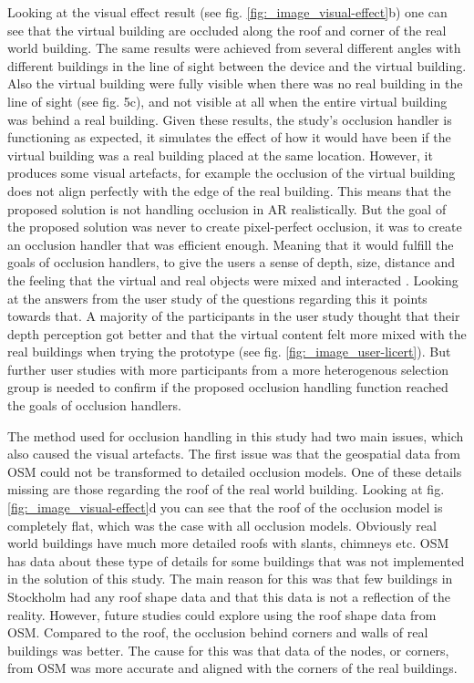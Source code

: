 Looking at the visual effect result (see fig. \ref{fig:_image_visual-effect}b) one can see that the virtual building are occluded along the roof and corner of the real world building. The same results were achieved from several different angles with different buildings in the line of sight between the device and the virtual building. Also the virtual building were fully visible when there was no real building in the line of sight (see fig. 5c), and not visible at all when the entire virtual building was behind a real building. Given these results, the study's occlusion handler is functioning as expected, it simulates the effect of how it would have been if the virtual building was a real building placed at the same location. However, it produces some visual artefacts, for example the occlusion of the virtual building does not align perfectly with the edge of the real building. This means that the proposed solution is not handling occlusion in AR realistically. But the goal of the proposed solution was never to create pixel-perfect occlusion, it was to create an occlusion handler that was efficient enough. Meaning that it would fulfill the goals of occlusion handlers, to give the users a sense of depth, size, distance and the feeling that the virtual and real objects were mixed and interacted \cite{shah2012occlusion}. Looking at the answers from the user study of the questions regarding this it points towards that. A majority of the participants in the user study thought that their depth perception got better and that the virtual content felt more mixed with the real buildings when trying the prototype (see fig. \ref{fig:_image_user-licert}). But further user studies with more participants from a more heterogenous selection group is needed to confirm if the proposed occlusion handling function reached the goals of occlusion handlers.

The method used for occlusion handling in this study had two main issues, which also caused the visual artefacts. The first issue was that the geospatial data from OSM could not be transformed to detailed occlusion models. One of these details missing are those regarding the roof of the real world building. Looking at fig.  \ref{fig:_image_visual-effect}d you can see that the roof of the occlusion model is completely flat, which was the case with all occlusion models. Obviously real world buildings have much more detailed roofs with slants, chimneys etc. OSM has data about these type of details for some buildings \cite{osm3Dbuildings} that was not implemented in the solution of this study. The main reason for this was that few buildings in Stockholm had any roof shape data and that this data is not a reflection of the reality. However, future studies could explore using the roof shape data from OSM. Compared to the roof, the occlusion behind corners and walls of real buildings was better. The cause for this was that data of the nodes, or corners, from OSM was more accurate and aligned with the corners of the real buildings.

